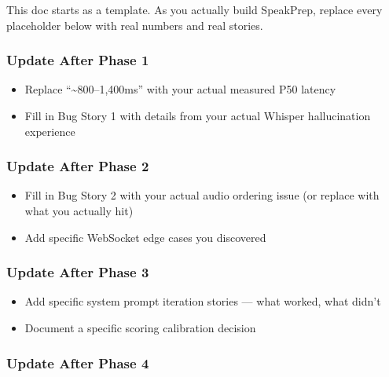 \documentclass[
  11pt,
]{article}
\providecommand{\tightlist}{%
  \setlength{\itemsep}{0pt}\setlength{\parskip}{0pt}}
\begin{document}
This doc starts as a template. As you actually build SpeakPrep, replace
every placeholder below with real numbers and real stories.

\hypertarget{update-after-phase-1}{%
\subsubsection{Update After Phase 1}\label{update-after-phase-1}}

\begin{itemize}
\tightlist
\item[$\square$]
  Replace ``\textasciitilde800--1,400ms'' with your actual measured P50
  latency
\item[$\square$]
  Fill in Bug Story 1 with details from your actual Whisper
  hallucination experience
\end{itemize}

\hypertarget{update-after-phase-2}{%
\subsubsection{Update After Phase 2}\label{update-after-phase-2}}

\begin{itemize}
\tightlist
\item[$\square$]
  Fill in Bug Story 2 with your actual audio ordering issue (or replace
  with what you actually hit)
\item[$\square$]
  Add specific WebSocket edge cases you discovered
\end{itemize}

\hypertarget{update-after-phase-3}{%
\subsubsection{Update After Phase 3}\label{update-after-phase-3}}

\begin{itemize}
\tightlist
\item[$\square$]
  Add specific system prompt iteration stories --- what worked, what
  didn't
\item[$\square$]
  Document a specific scoring calibration decision
\end{itemize}

\hypertarget{update-after-phase-4}{%
\subsubsection{Update After Phase 4}\label{update-after-phase-4}}
\end{document}
